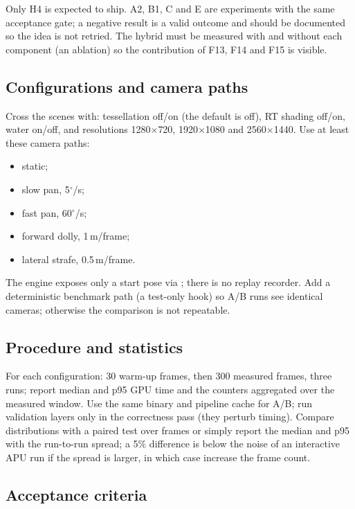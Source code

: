 \documentclass[11pt,a4paper]{article}
\newcommand{\code}[1]{\texttt{\detokenize{#1}}}
\theoremstyle{plain}
\theoremstyle{definition}
\theoremstyle{remark}
\begin{document}
Only H4 is expected to ship. A2, B1, C and E are experiments with the same
acceptance gate; a negative result is a valid outcome and should be documented
so the idea is not retried. The hybrid must be measured with and without each
component (an ablation) so the contribution of F13, F14 and F15 is visible.

\subsection{Configurations and camera paths}

Cross the scenes with: tessellation off/on (the default is off), RT shading
off/on, water on/off, and resolutions 1280$\times$720, 1920$\times$1080 and
2560$\times$1440. Use at least these camera paths:
\begin{itemize}[leftmargin=1.3em,itemsep=1pt]
\item static;
\item slow pan, 5$^\circ$/s;
\item fast pan, 60$^\circ$/s;
\item forward dolly, 1\,m/frame;
\item lateral strafe, 0.5\,m/frame.
\end{itemize}
The engine exposes only a start pose via \code{VULKAN_CAMERA}; there is no
replay recorder. Add a deterministic benchmark path (a test-only hook) so A/B
runs see identical cameras; otherwise the comparison is not repeatable.

\subsection{Procedure and statistics}

For each configuration: 30 warm-up frames, then 300 measured frames, three
runs; report median and p95 GPU time and the counters aggregated over the
measured window. Use the same binary and pipeline cache for A/B; run validation
layers only in the correctness pass (they perturb timing). Compare distributions
with a paired test over frames or simply report the median and p95 with the
run-to-run spread; a 5\% difference is below the noise of an interactive APU
run if the spread is larger, in which case increase the frame count.

\subsection{Acceptance criteria}
\end{document}
